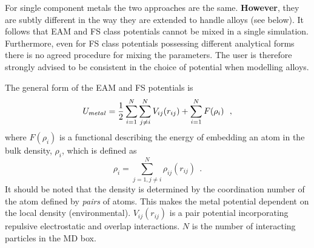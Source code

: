 For single component metals the two approaches are the same.  {\bf
However}, they are subtly different in the way they are extended to
handle alloys (see below). It follows that EAM and FS class potentials
cannot be mixed in a single simulation.  Furthermore, even for FS
class potentials possessing different analytical forms there is no
agreed procedure for mixing the parameters.  The user is therefore
strongly advised to be consistent in the choice of potential when
modelling alloys.

The general form of the EAM and FS potentials is \cite{friedel-52a}
\begin{equation}
U_{metal} = {1 \over 2} \sum_{i=1}^{N} \sum_{j \ne i}^{N} V_{ij}(r_{ij}) +
\sum_{i=1}^{N} F(\rho_{i})~~, \label{um}
\end{equation}
where $F(\rho_{i})$ is a functional describing the energy of embedding
an atom in the bulk density, $\rho_{i}$, which is defined as
\begin{equation}
\rho_{i} = \sum_{j=1, j \ne i}^{N} \rho_{ij}(r_{ij})~~. \label{umd}
\end{equation}
It should be noted that the density is determined by the coordination
number of the atom defined by {\em pairs} of atoms.  This makes the
metal potential dependent on the local density (environmental).
$V_{ij}(r_{ij})$ is a pair potential incorporating repulsive
electrostatic and overlap interactions.  $N$ is the number of
interacting particles in the MD box.

